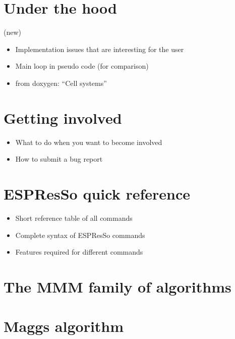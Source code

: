 \documentclass[
a4paper,                        %
11pt,                           %
twoside,                        %
footsepline,                    %
headsepline,                    %
headexclude,                    %
footexclude,                    %
pagesize,                       %
bibtotocnumbered,               %
idxtotoc                        %
]{scrreprt}
\newcommand{\es}{\textsf{ESPResSo}}
\begin{document}


\chapter{Under the hood}
\label{chap:underhood}

(new)

\begin{itemize}
\item Implementation issues that are interesting for the user
\item Main loop in pseudo code (for comparison)
\item from doxygen: ``Cell systems'' 
\end{itemize}


\chapter{Getting involved}
\label{chap:devel}

\begin{itemize}
\item What to do when you want to become involved
\item How to submit a bug report
\end{itemize}


\appendix
\chapter{\es{} quick reference}
\label{chap:quickref}

\begin{itemize}
\item Short reference table of all commands
\item Complete syntax of \es{} commands
\item Features required for different commands
\end{itemize}

\chapter{The MMM family of algorithms}
\label{chap:mmm}

\chapter{Maggs algorithm}
\label{chap:maggs}
\end{document}
